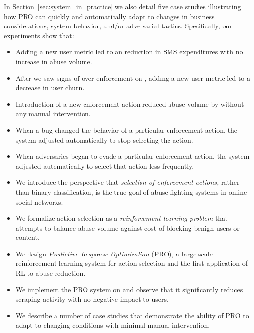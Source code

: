 In Section~\ref{sec:system_in_practice} we also detail five case studies illustrating how PRO can quickly and automatically adapt to changes in business considerations, system behavior, and/or adversarial tactics. Specifically, our experiments show that:
\begin{itemize}
\squeezelist
	\item Adding a new user metric led to an \smsreduction reduction in SMS expenditures with no increase in abuse volume.
	\item After we saw signs of over-enforcement on \surface, adding a new user metric led to a \mwebdaulossreduction decrease in user churn.
	\item Introduction of a new enforcement action reduced abuse volume by \newresponsereduction without any manual intervention.
	\item When a bug changed the behavior of a particular enforcement action, the system adjusted automatically to stop selecting the action.
	\item When adversaries began to evade a particular enforcement action, the system adjusted automatically to select that action less frequently.
\end{itemize}

\begin{itemize}
\squeezelist
    \item We introduce the perspective that {\em selection of enforcement actions,} rather than binary classification, is the true goal of abuse-fighting systems in online social networks.
    \item We formalize action selection as a {\em reinforcement learning problem} that attempts to balance abuse volume against cost of blocking benign users or content.
    \item We design {\em Predictive Response Optimization} (PRO), a large-scale reinforcement-learning system for action selection and the first application of RL to abuse reduction.
    \item We implement the PRO system on \fbig and observe that it significantly reduces scraping activity with no negative impact to users.
    \item We describe a number of case studies that demonstrate the ability of PRO to adapt to changing conditions with minimal manual intervention.
\end{itemize}
